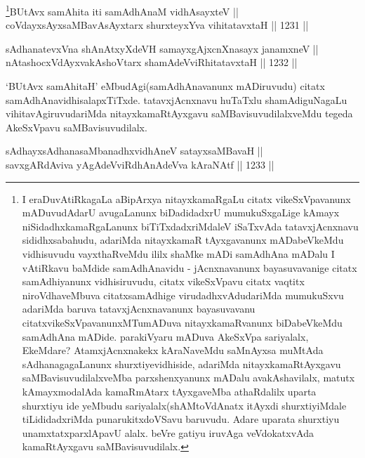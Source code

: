 
\begin{shl}
\footnote{I eraDuvAtiRkagaLa aBipArxya nitayxkamaRgaLu citatx vikeSxVpavanunx mADuvudAdarU avugaLanunx biDadidadxrU mumukuSxgaLige kAmayx niSidadhxkamaRgaLanunx biTiTxdadxriMdaleV iSaTxvAda tatavxjAcnxnavu sididhxsabahudu, adariMda nitayxkamaR tAyxgavanunx mADabeVkeMdu vidhisuvudu vayxthaRveMdu ililx shaMke mADi samAdhAna  mADalu I vAtiRkavu baMdide samAdhAnavidu - jAcnxnavanunx bayasuvavanige citatx samAdhiyanunx vidhisiruvudu, citatx vikeSxVpavu citatx vaqtitx niroVdhaveMbuva citatxsamAdhige virudadhxvAdudariMda mumukuSxvu adariMda baruva tatavxjAcnxnavanunx bayasuvavanu citatxvikeSxVpavanunxMTumADuva nitayxkamaRvanunx biDabeVkeMdu samAdhAna mADide. parakiVyaru mADuva AkeSxVpa sariyalalx, EkeMdare? AtamxjAcnxnakekx kAraNaveMdu saMnAyxsa muMtAda sAdhanagagaLanunx shurxtiyevidhiside, adariMda nitayxkamaRtAyxgavu saMBavisuvudilalxveMba parxshenxyanunx mADalu avakAshavilalx, matutx kAmayxmodalAda kamaRmAtarx tAyxgaveMba athaRdalilx uparta shurxtiyu ide yeMbudu sariyalalx(shAMtoVdAnatx itAyxdi shurxtiyiMdale tiLididadxriMda punarukitxdoVSavu baruvudu. Adare uparata shurxtiyu unamxtatxparxlApavU alalx. beVre gatiyu iruvAga veVdokatxvAda kamaRtAyxgavu saMBavisuvudilalx.}BUtAvx samAhita iti samAdhAnaM vidhAsayxteV || \\
coVdayxsAyxsaMBavA\s sAyxtarx shurxteyxYva vihitatavxtaH \hfill || 1231 ||  
\end{shl}
				
\begin{shl}
sAdhanatevxVna shAnAtxyXdeVH samayxgAjxcnXnasayx janamxneV || \\
nAtashocxVdAyxvakAshoV\s tarx shamAdeVviRhitatavxtaH \hfill || 1232 ||  
\end{shl}

\begin{artha}
`BUtAvx samAhitaH' eMbudAgi(samAdhAnavanunx mADiruvudu) citatx samAdhAnavidhisalapxTiTxde. tatavxjAcnxnavu huTaTxlu shamAdiguNagaLu vihitavAgiruvudariMda nitayxkamaRtAyxgavu saMBavisuvudilalxveMdu tegeda AkeSxVpavu saMBavisuvudilalx.
\end{artha}


\begin{shl}
sAdhayxsAdhanasaMbanadhxvidhAneV satayxsaMBavaH ||  \\
savxgARdAviva yAgAdeVviRdhAnAdeVva kAraNAtf \hfill || 1233 ||  
\end{shl}

